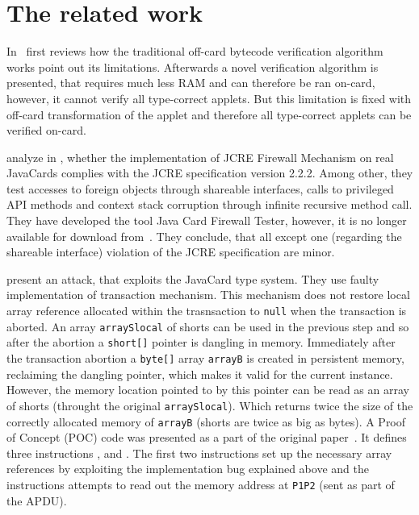\section{The related work}\label{sec:related-work}
    
    In~\cite{oncardleroy} \citeauthor{oncardleroy} first reviews how the traditional off-card bytecode verification algorithm works point out its limitations. Afterwards a novel verification algorithm is presented, that requires much less RAM and can therefore be ran on-card, however, it cannot verify all type-correct applets. But this limitation is fixed with off-card transformation of the applet and therefore all type-correct applets can be verified on-card.

    \citeauthor{Mostowski07testingthe} analyze in \cite{Mostowski07testingthe}, whether the implementation of JCRE Firewall Mechanism on real JavaCards complies with the JCRE specification version 2.2.2. Among other, they test accesses to foreign objects through shareable interfaces, calls to privileged API methods and context stack corruption through infinite recursive method call. They have developed the tool Java Card Firewall Tester, however, it is no longer available for download from~\cite{firewalltester}. They conclude, that all except one (regarding the shareable interface) violation of the JCRE specification are minor.

\citeauthor{hogenboom} present an attack, that exploits the JavaCard type system. They use faulty implementation of transaction mechanism. This mechanism does not restore local array reference allocated within the trasnsaction to \texttt{null} when the transaction is aborted. An array \texttt{arraySlocal} of shorts can be used in the previous step and so after the abortion a \texttt{short[]} pointer is dangling in memory. Immediately after the transaction abortion a \texttt{byte[]} array \texttt{arrayB} is created in persistent memory, reclaiming the dangling pointer, which makes it valid for the current instance. However, the memory location pointed to by this pointer can be read as an array of shorts (throught the original \texttt{arraySlocal}). Which returns twice the size of the correctly allocated memory of \texttt{arrayB} (shorts are twice as big as bytes). A Proof of Concept (POC) code was presented as a part of the original paper~\cite{hogenboom}. It defines three instructions \prepareone, \preparetwo and \insreadmem. The first two instructions set up the necessary array references by exploiting the implementation bug explained above and the \insreadmem instructions attempts to read out the memory address at \texttt{P1P2} (sent as part of the APDU).

